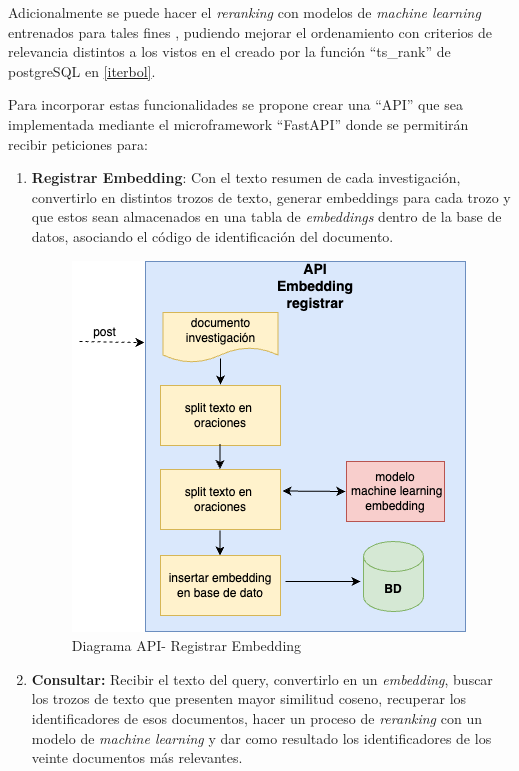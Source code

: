 \documentclass[
  12pt,
  openany]{book}
\begin{document}
Adicionalmente se puede hacer el \emph{reranking} con modelos de \emph{machine learning} entrenados para tales fines \citep{gökçe2020}, \citep{nogueira2019} pudiendo mejorar el ordenamiento con criterios de relevancia distintos a los vistos en el creado por la función ``ts\_rank'' de postgreSQL en \ref{iterbol}.

Para incorporar estas funcionalidades se propone crear una ``API'' que sea implementada mediante el microframework ``FastAPI'' donde se permitirán recibir peticiones para:

\begin{enumerate}
\def\labelenumi{\arabic{enumi}.}
\item
  \textbf{Registrar Embedding}: Con el texto resumen de cada investigación, convertirlo en distintos trozos de texto, generar embeddings para cada trozo y que estos sean almacenados en una tabla de \emph{embeddings} dentro de la base de datos, asociando el código de identificación del documento.

  \begin{figure}

  {\centering \includegraphics[width=0.45\linewidth]{images/05-desarrollo/5_ciclo/diagramapiregistrar} 

  }

  \caption{Diagrama API- Registrar Embedding}\label{fig:semanticoregistrar}
  \end{figure}
\item
  \textbf{Consultar:} Recibir el texto del query, convertirlo en un \emph{embedding}, buscar los trozos de texto que presenten mayor similitud coseno, recuperar los identificadores de esos documentos, hacer un proceso de \emph{reranking} con un modelo de \emph{machine learning} y dar como resultado los identificadores de los veinte documentos más relevantes.

  \begin{figure}


\end{figure}
\end{enumerate}
\end{document}
